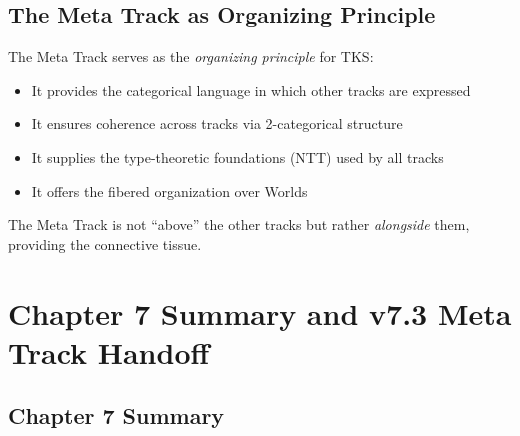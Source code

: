 \subsection{The Meta Track as Organizing Principle}
\label{subsec:meta-organizing}

\begin{remark}
\label{rem:meta-role}
The Meta Track serves as the \emph{organizing principle} for TKS:
\begin{itemize}
  \item It provides the categorical language in which other tracks are expressed
  \item It ensures coherence across tracks via 2-categorical structure
  \item It supplies the type-theoretic foundations (NTT) used by all tracks
  \item It offers the fibered organization over Worlds
\end{itemize}
The Meta Track is not ``above'' the other tracks but rather \emph{alongside}
them, providing the connective tissue.
\end{remark}

\section{Chapter 7 Summary and v7.3 Meta Track Handoff}
\label{sec:ch7-summary-handoff}

\subsection{Chapter 7 Summary}
\label{subsec:ch7-summary}

